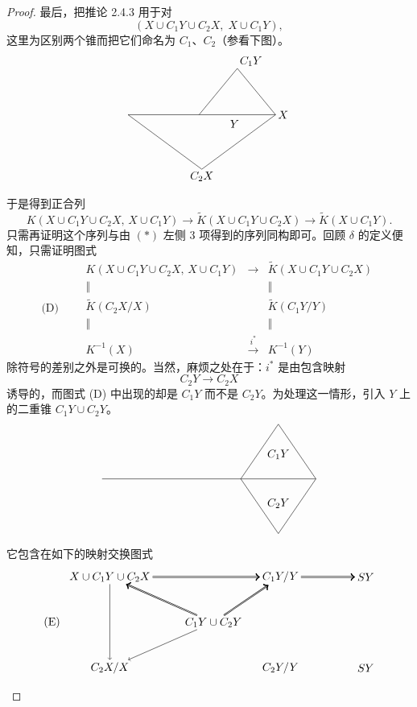 \begin{proof}
  最后，把推论 2.4.3 用于对
  \[
  (X\cup C_1Y\cup C_2X,\;X\cup C_1Y),
  \]
  这里为区别两个锥而把它们命名为 $C_1$、$C_2$（参看下图）。
  \[
  \begin{tikzpicture}[scale=0.85,every node/.style={inner sep=2pt}]
  \coordinate (A) at (0,0);
  \coordinate (M) at (2.6,0);
  \coordinate (P) at (5.4,0);
  \coordinate (T) at (4.0,1.7);
  \coordinate (B) at (2.7,-2.0);
  \draw (A) -- (P);
  \draw (M) -- (T) -- (P);
  \draw (A) -- (B) -- (P);
  \node[above right] at (T) {$C_1Y$};
  \node[below] at (B) {$C_2X$};
  \node[right] at (P) {$X$};
  \node[below] at (3.9,-0.1) {$Y$};
  \end{tikzpicture}
  \]
  于是得到正合列
  \[
  K(X\cup C_1Y\cup C_2X,\,X\cup C_1Y)\longrightarrow
  \tilde K(X\cup C_1Y\cup C_2X)\longrightarrow\tilde K(X\cup C_1Y).
  \]
  只需再证明这个序列与由 $(*)$ 左侧 3 项得到的序列同构即可。回顾 $\delta$ 的定义便知，只需证明图式
  \[
  \text{(D)}\qquad
  \begin{array}{ccc}
  K(X\cup C_1Y\cup C_2X,\,X\cup C_1Y) & \longrightarrow & \tilde K(X\cup C_1Y\cup C_2X)\\[2pt]
  \Vert & & \Vert\\[2pt]
  \tilde K(C_2X/X) & & \tilde K(C_1Y/Y)\\[2pt]
  \Vert & & \Vert\\[2pt]
  K^{-1}(X) & \xrightarrow{\ i^*\ } & K^{-1}(Y)
  \end{array}
  \]
  除符号的差别之外是可换的。当然，麻烦之处在于：$i^*$ 是由包含映射
  \[
  C_2Y\longrightarrow C_2X
  \]
  诱导的，而图式 (D) 中出现的却是 $C_1Y$ 而不是 $C_2Y$。为处理这一情形，引入 $Y$ 上的二重锥 $C_1Y\cup C_2Y$。
  \[
  \begin{tikzpicture}[scale=0.9]
  \draw (0,0) -- (7.4,0);
  \draw (4.8,0) -- (6.1,1.9) -- (7.4,0) -- (6.1,-1.9) -- cycle;
  \node at (6.1,0.85) {$C_1Y$};
  \node at (6.1,-0.85) {$C_2Y$};
  \end{tikzpicture}
  \]
  它包含在如下的映射交换图式
  \[
  \begin{tikzpicture}[scale=0.95,every node/.style={inner sep=2pt}]
  \node (A) at (0,1.5) {$X\cup C_1Y\cup C_2X$};
  \node (B) at (5.6,1.5) {$C_1Y/Y$};
  \node (C) at (8.4,1.5) {$SY$};
  \node (D) at (3.4,0) {$C_1Y\cup C_2Y$};
  \node (E) at (0,-1.5) {$C_2X/X$};
  \node (F) at (5.6,-1.5) {$C_2Y/Y$};
  \node (G) at (8.4,-1.5) {$SY$};
  \node at (-1.9,0) {(E)};
  \draw[->,double] (A) -- (B);
  \draw[->,double] (B) -- (C);
  \draw[->] (A) -- (E);
  \draw[->,double] (D) -- (A);
  \draw[->,double] (D) -- (B);
  \draw[->] (D) -- (E);

\end{tikzpicture}\]
\end{proof}
